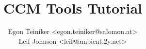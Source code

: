 \documentclass[11pt]{book}
\title{{\Huge CCM Tools Tutorial}}
\author{Egon Teiniker <egon.teiniker@salomon.at>\\
Leif Johnson <leif@ambient.2y.net>}
\begin{document}
\maketitle
\cleardoublepage

\tableofcontents

\cleardoublepage
{}
\setlength{\parskip}{1em}





\begin{appendix}




\end{appendix}



\end{document}
